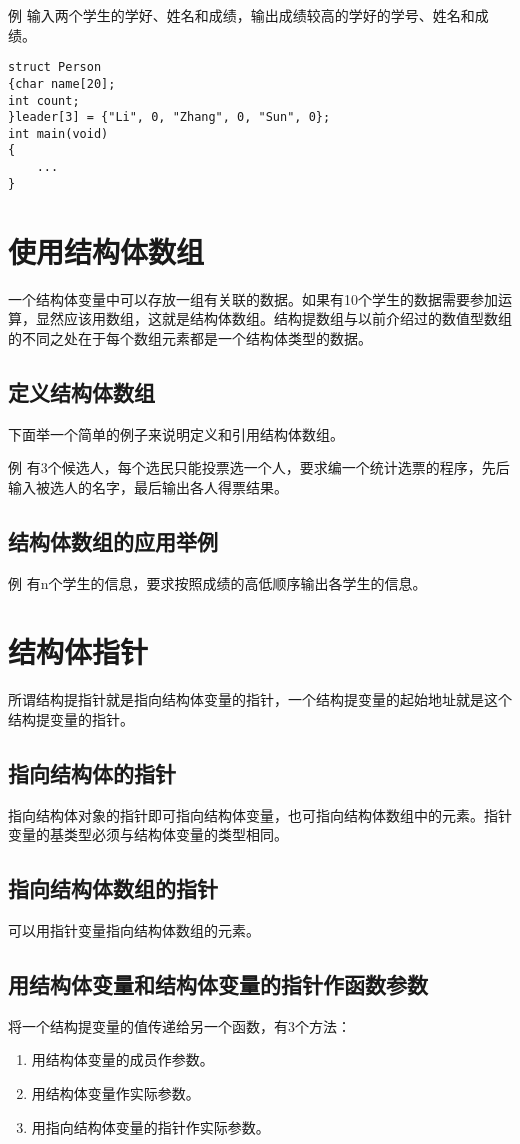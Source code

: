 例 输入两个学生的学好、姓名和成绩，输出成绩较高的学好的学号、姓名和成绩。
\begin{lstlisting}
struct Person
{char name[20];
int count;
}leader[3] = {"Li", 0, "Zhang", 0, "Sun", 0};
int main(void)
{
	...
}
\end{lstlisting}

\section{使用结构体数组}
一个结构体变量中可以存放一组有关联的数据。如果有10个学生的数据需要参加运算，显然应该用数组，这就是结构体数组。结构提数组与以前介绍过的数值型数组的不同之处在于每个数组元素都是一个结构体类型的数据。
\subsection{定义结构体数组}
下面举一个简单的例子来说明定义和引用结构体数组。

例 有3个候选人，每个选民只能投票选一个人，要求编一个统计选票的程序，先后输入被选人的名字，最后输出各人得票结果。
\subsection{结构体数组的应用举例}
例 有n个学生的信息，要求按照成绩的高低顺序输出各学生的信息。

\section{结构体指针}
所谓结构提指针就是指向结构体变量的指针，一个结构提变量的起始地址就是这个结构提变量的指针。
\subsection{指向结构体的指针}
指向结构体对象的指针即可指向结构体变量，也可指向结构体数组中的元素。指针变量的基类型必须与结构体变量的类型相同。
\subsection{指向结构体数组的指针}
可以用指针变量指向结构体数组的元素。
\subsection{用结构体变量和结构体变量的指针作函数参数}
将一个结构提变量的值传递给另一个函数，有3个方法：
\begin{enumerate}
	\item 用结构体变量的成员作参数。
	\item 用结构体变量作实际参数。
	\item 用指向结构体变量的指针作实际参数。
\end{enumerate}


